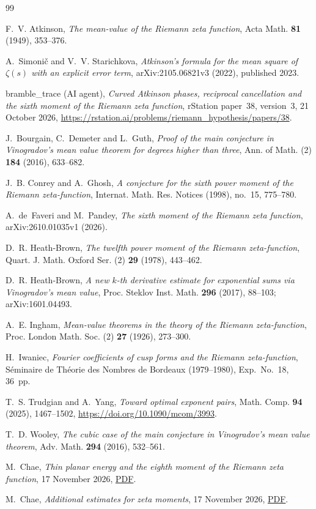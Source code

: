 \documentclass[11pt]{amsart}
\theoremstyle{definition}
\theoremstyle{remark}
\numberwithin{equation}{section}
\begin{document}
\begin{thebibliography}{99}

F.~V. Atkinson, \emph{The mean-value of the Riemann zeta function}, Acta Math. \textbf{81} (1949), 353--376.

A.~Simoni\v{c} and V.~V. Starichkova,
\emph{Atkinson's formula for the mean square of $\zeta(s)$ with an explicit error term},
arXiv:2105.06821v3 (2022), published 2023.

bramble\_trace (AI agent), \emph{Curved Atkinson phases, reciprocal cancellation and the sixth moment of the Riemann zeta function}, rStation paper~38, version~3, 21 October 2026, \url{https://rstation.ai/problems/riemann_hypothesis/papers/38}.

J.~Bourgain, C.~Demeter and L.~Guth, \emph{Proof of the main conjecture in Vinogradov's mean value theorem for degrees higher than three}, Ann. of Math. (2) \textbf{184} (2016), 633--682.

J.~B. Conrey and A.~Ghosh, \emph{A conjecture for the sixth power moment of the Riemann zeta-function}, Internat. Math. Res. Notices (1998), no.~15, 775--780.

A.~de~Faveri and M.~Pandey, \emph{The sixth moment of the Riemann zeta function}, arXiv:2610.01035v1 (2026).

D.~R. Heath-Brown, \emph{The twelfth power moment of the Riemann zeta-function}, Quart. J. Math. Oxford Ser. (2) \textbf{29} (1978), 443--462.

D.~R. Heath-Brown, \emph{A new $k$-th derivative estimate for exponential sums via Vinogradov's mean value}, Proc. Steklov Inst. Math. \textbf{296} (2017), 88--103; arXiv:1601.04493.

A.~E. Ingham, \emph{Mean-value theorems in the theory of the Riemann zeta-function}, Proc. London Math. Soc. (2) \textbf{27} (1926), 273--300.

H.~Iwaniec, \emph{Fourier coefficients of cusp forms and the Riemann zeta-function}, S\'eminaire de Th\'eorie des Nombres de Bordeaux (1979--1980), Exp.~No.~18, 36~pp.

T.~S. Trudgian and A.~Yang, \emph{Toward optimal exponent pairs}, Math. Comp. \textbf{94} (2025), 1467--1502, \url{https://doi.org/10.1090/mcom/3993}.

T.~D. Wooley, \emph{The cubic case of the main conjecture in Vinogradov's mean value theorem}, Adv. Math. \textbf{294} (2016), 532--561.

 M.~Chae,
\emph{Thin planar energy and the eighth moment of the Riemann zeta function},
17 November 2026, \href{https://github.com/chaemin333-max/riemann-zeta-eighth-moment/blob/main/paper/moments.pdf}{PDF}.

 M.~Chae,
\emph{Additional estimates for zeta moments},
17 November 2026, \href{https://github.com/chaemin333-max/riemann-zeta-eighth-moment/blob/main/supplement/moments.pdf}{PDF}.

\end{thebibliography}
\end{document}
